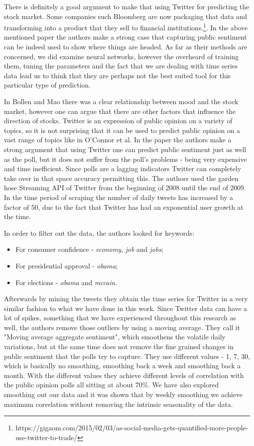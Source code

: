 \documentclass[minf,twoside,singlespacing,parskip,frontabs,notimes,12pt]{infthesis} %
\begin{document}
There is definitely a good argument to make that using Twitter for predicting the stock market. 
Some companies such Bloomberg are now packaging that data and transforming into a product that they sell to financial institutions.\footnote{https://gigaom.com/2015/02/03/as-social-media-gets-quantified-more-people-use-twitter-to-trade/}. 
In the above mentioned paper the authors make a strong case that capturing public sentiment can be indeed used to show where things are headed. 
As far as their methods are concerned, we did examine neural networks, however the overheard of training them, tuning the parameters and the fact that we are dealing with time series data lead us to think that they are perhaps not the best suited tool for this particular type of prediction. 

In Bollen and Mao\cite{twitstock} there was a clear relationship between mood and the stock market, however one can argue that there are other factors that influence the direction of stocks. 
Twitter is an expression of public opinion on a variety of topics, so it is not surprising that it can be used to predict public opinion on a vast range of topics like in O'Connor et al\cite{twitpoll}. 
In the paper the authors make a strong argument that using Twitter one can predict public sentiment just as well as the poll, but it does not suffer from the poll's problems - being very expensive and time inefficient. 
Since polls are a lagging indicators Twitter can completely take over in that space accuracy permitting this.
The authors used the garden hose Streaming API of Twitter from the beginning of 2008 until the end of 2009. 
In the time period of scraping the number of daily tweets has increased by a factor of 50, due to the fact that Twitter has had an exponential user growth at the time.

In order to filter out the data, the authors looked for keywords:
\begin{itemize}	
\item For consumer confidence - \textit{economy}, \textit{job} and \textit{jobs};
\item For presidential approval - \textit{obama};
\item For elections - \textit{obama} and \textit{mccain}.
\end{itemize}

Afterwards by mining the tweets they obtain the time series for Twitter in a very similar fashion to what we have done in this work. 
Since Twitter data can have a lot of spikes, something that we have experienced throughout this research as well, the authors remove those outliers by using a moving average. 
They call it "Moving average aggregate sentiment", which smoothens the volatile daily variations, but at the same time does not remove the fine grained changes in public sentiment that the polls try to capture. 
They use different values - 1, 7, 30, which is basically no smoothing, smoothing back a week and smoothing back a month. 
With the different values they achieve different levels of correlation with the public opinion polls all sitting at about 70\%. 
We have also explored smoothing out our data and it was shown that by weekly smoothing we achieve maximum correlation without removing the intrinsic seasonality of the data.
\end{document}
